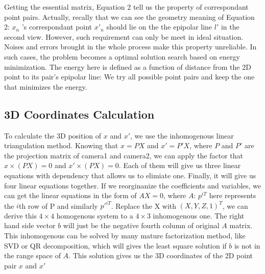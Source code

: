 \documentclass[10pt,twocolumn,letterpaper]{article}
\begin{document}
Getting the essential matrix, Equation 2 tell us 
the property of correspondant point pairs. 
Actually, recally that \endequation 
we can see the geometry meaning of Equation 2: $x_{n}$ 's 
correspondant point $x'_{n}$ should lie on the 
the epipolar line $l'$ in the second view. 
However, such requirement can only be meet in 
ideal situation. Noises and errors brought in the 
whole process make this property unreliable. 
In such cases, the problem becomes a optimal 
solution search based on energy minimization. 
The energy here is defined as a function of distance 
from the 2D point to its pair's epipolar line: 
  \endequation 
We try all possible point pairs and 
keep the one that minimizes the energy.

\subsection{3D Coordinates Calculation}
To calculate the 3D position of $x$ and $x'$, we use the inhomogenous linear triangulation method\cite{Hartley03}. Knowing that $x = PX$ and $x' = P'X$, where $P$ and $P'$ are the projection matrix of camera1 and camera2, we can apply the factor that $x\times(PX) = 0$ and $x'\times(PX) = 0$. Each of them will give us three linear equations with dependency that allows us to elimiate one. Finally, it will give us four linear equations together. If we reorginanize the coefficients and variables, we can get the linear equations in the form of $AX = 0$, where $A$:
\endequation
$p^{iT}$ here represents the $i$th row of P and similarly $p'^{iT}$. Replace the X with $(X,Y,Z,1)^{T}$, we can derive this $4\times4$ homogenous system to a $4\times3$ inhomogenous one. The right hand side vector $b$ will just be the negative fourth column of original $A$ matrix. This inhomogenous can be solved by many mature factorization method, like SVD or QR decomposition, which will gives the least square solution if $b$ is not in the range space of $A$. This solution gives us the 3D coordinates of the 2D point pair $x$ and $x'$
\end{document}

